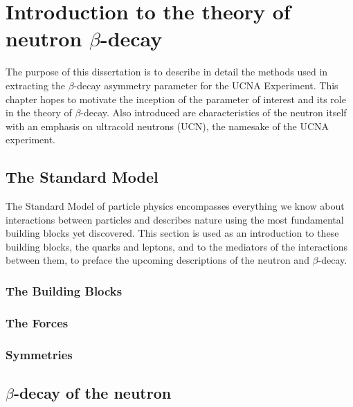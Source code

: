 \chapter{Introduction to the theory of neutron $\beta$-decay}
\label{ch:Introduction}

The purpose of this dissertation is to describe in detail
the methods used in extracting the $\beta$-decay asymmetry parameter
for the UCNA Experiment. This chapter hopes to motivate the inception
of the parameter of interest and its role in the theory of $\beta$-decay.
Also introduced are characteristics of the neutron itself with an
emphasis on ultracold neutrons (UCN), the namesake of the UCNA experiment.


\section{The Standard Model}
The Standard Model of particle physics encompasses everything we know about
interactions between particles and describes nature using the most fundamental
building blocks yet discovered. This section is used as an introduction
to these building blocks, the quarks and leptons, and to the mediators of the
interactions between them, to preface the upcoming descriptions of the neutron
and $\beta$-decay.

\subsection{The Building Blocks}

\subsection{The Forces}

\subsection{Symmetries}




\section{$\beta$-decay of the neutron}

